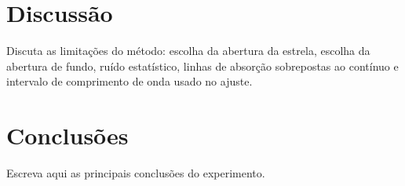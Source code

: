 \documentclass{aa}
\begin{document}
\section{Discussão}

Discuta as limitações do método: escolha da abertura da estrela, escolha da abertura de fundo, ruído estatístico, linhas de absorção sobrepostas ao contínuo e intervalo de comprimento de onda usado no ajuste.

\section{Conclusões}

Escreva aqui as principais conclusões do experimento.
\end{document}
